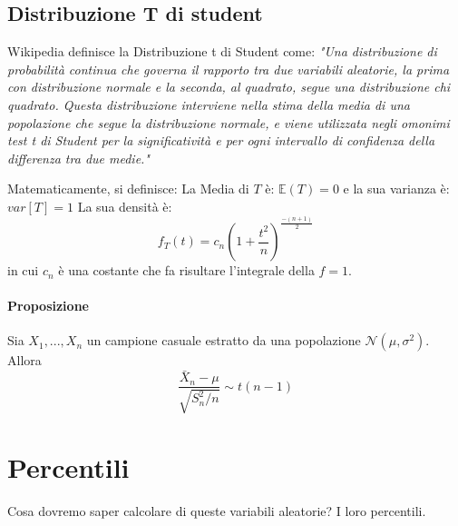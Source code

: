 \subsection{Distribuzione T di student}
Wikipedia definisce la Distribuzione t di Student come:
\emph{
"Una distribuzione di probabilità continua che governa il rapporto tra due variabili aleatorie, 
la prima con distribuzione normale e la seconda, al quadrato, segue una distribuzione chi quadrato.
Questa distribuzione interviene nella stima della media di una popolazione che segue la distribuzione normale, 
e viene utilizzata negli omonimi test t di Student per la significatività e per ogni intervallo 
di confidenza della differenza tra due medie."
}

Matematicamente, si definisce:
La Media di $T$ è: $\mathbb{E}(T)=0$ e la sua varianza è: $var[T] = 1$
La sua densità è:
\[
    f_T(t) = c_n(1+\frac{t^2}{n})^{\frac{-(n+1)}{2}}
\]
in cui $c_n$ è una costante che fa risultare l'integrale della $f = 1$.
\paragraph*{Proposizione} Sia $X_1, ..., X_n$ un campione casuale estratto da
una popolazione $\mathcal{N}(\mu, \sigma^2)$. Allora
\[
    \frac{\bar{X}_n-\mu}{\sqrt{S^2_{n}/ n}} \sim t(n-1)
\]
\section{Percentili}
Cosa dovremo saper calcolare di queste variabili aleatorie? I loro percentili.

